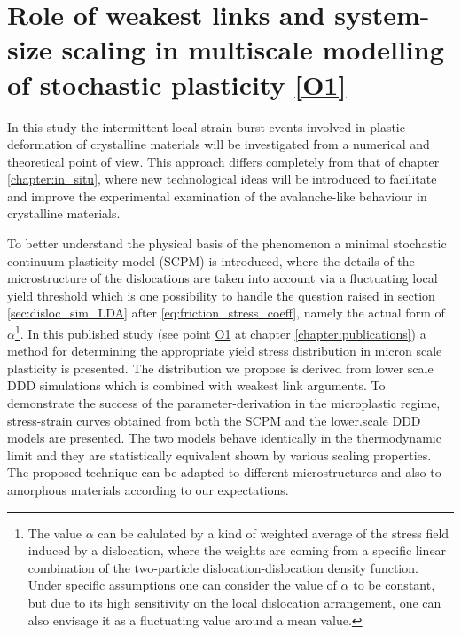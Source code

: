 \chapter[From discrete to continuum dislocation dynamics]{Role of weakest links and system-size scaling in multiscale modelling of stochastic plasticity \hyperref[paper:A2]{[O1]}} \label{chapter:weakest_link}

\ifpdf
    \graphicspath{{Chapter4/Figs/Raster/}{Chapter4/Figs/PDF/}{Chapter4/Figs/}}
\else
    \graphicspath{{Chapter4/Figs/Vector/}{Chapter4/Figs/}}
\fi

In this study the intermittent local strain burst events involved in plastic deformation of crystalline materials will be investigated from a numerical and theoretical point of view. This approach differs completely from that of chapter \ref{chapter:in_situ}, where new technological ideas will be introduced to facilitate and improve the experimental examination of the avalanche-like behaviour in crystalline materials.

To better understand the physical basis of the phenomenon a minimal stochastic continuum plasticity model (SCPM)  is introduced, where the details of the microstructure of the dislocations are taken into account via a fluctuating local yield threshold which is one possibility to handle the question raised in section \ref{sec:disloc_sim_LDA} after \cref{eq:friction_stress_coeff}, namely the actual form of $\alpha$\footnote{The value $\alpha$ can be calulated by a kind of weighted average of the stress field induced by a dislocation, where the weights are coming from a specific linear combination of the two-particle dislocation-dislocation density function. Under specific assumptions one can consider the value of $\alpha$ to be constant, but due to its high sensitivity on the local dislocation arrangement, one can also envisage it as a fluctuating value around a mean value.}. In this published study (see point \hyperref[paper:A2]{O1} at chapter \ref{chapter:publications}) a method for determining the appropriate yield stress distribution in micron scale plasticity is presented. The distribution we propose is derived from lower scale DDD simulations which is combined with weakest link arguments. To demonstrate the success of the parameter-derivation in the microplastic regime, stress-strain curves obtained from both the SCPM and the lower.scale DDD models are presented. The two models behave identically in the thermodynamic limit and they are statistically equivalent shown by various scaling properties. The proposed technique can be adapted to different microstructures and also to amorphous materials according to our expectations.

